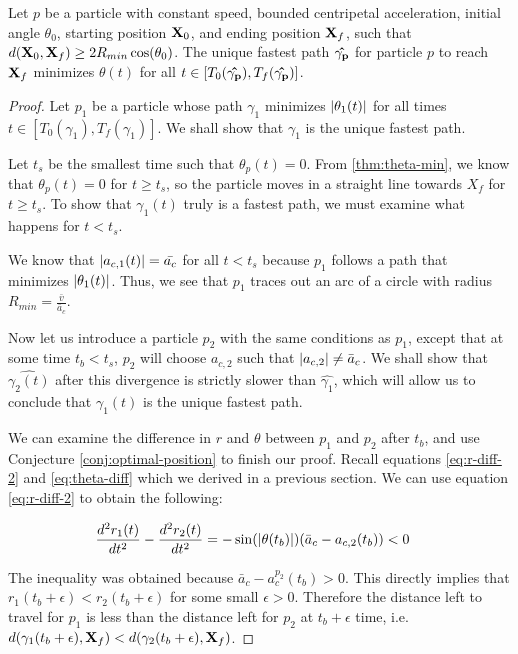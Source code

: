 \begin{theorem}
  Let  $p$ be a particle with constant speed, bounded centripetal acceleration, initial angle $\theta_0$, starting position $\mathbf{X}_0$, and ending position $\mathbf{X}_f$, such that $d(\bvec{X}_0, \bvec{X}_f) \ge 2 R_{min} \cos\paren{\theta_0}$. The unique fastest path $\mathbf{\hat{\gamma_p}}$ for particle $p$ to reach $\mathbf{X}_f$ minimizes $\theta(t)$ for all $t \in [T_0(\mathbf{\hat{\gamma_p}}), T_f(\mathbf{\hat{\gamma_p}})]$.
  \label{thm:restricted-theta}
\end{theorem}
\begin{proof}
Let $p_1$ be a particle whose path $\gamma_1$ minimizes $\abs{\theta_1(t)}$ for all times $t \in [T_0(\gamma_1), T_f(\gamma_1)]$. We shall show that $\gamma_1$ is the unique fastest path.

Let $t_s$ be the smallest time such that $\theta_p(t) = 0$. From \ref{thm:theta-min}, we know that $\theta_p(t) = 0$ for $t \ge t_s$, so the particle moves in a straight line towards $X_f$ for $t \ge t_s$. To show that $\gamma_1(t)$ truly is a fastest path, we must examine what happens for $t < t_s$.

We know that $\abs{a_{c,1}(t)} = \bar{a_c}$ for all $t < t_s$ because $p_1$ follows a path that minimizes $\abs{\theta_1(t)}$. Thus, we see that $p_1$ traces out an arc of a circle with radius $R_{min} = \frac{\bar{v}}{\bar{a}_c}$.

Now let us introduce a particle $p_2$ with the same conditions as $p_1$, except that at some time $t_b < t_s$, $p_2$ will choose $a_{c,2}$ such that $\abs{a_{c,2}} \neq \bar{a}_c$. We shall show that $\hat{\gamma_2(t)}$ after this divergence is strictly slower than $\hat{\gamma_1}$, which will allow us to conclude that $\gamma_1(t)$ is the unique fastest path.

We can examine the difference in $r$ and $\theta$ between $p_1$ and $p_2$ after $t_b$, and use Conjecture \ref{conj:optimal-position} to finish our proof. Recall equations \ref{eq:r-diff-2} and \ref{eq:theta-diff} which we derived in a previous section. We can use equation \ref{eq:r-diff-2} to obtain the following:

\begin{align*}
  \frac{d^2 r_1(t)}{d t^2} - \frac{d^2 r_2(t)}{d t^2} = - \sin\paren{\abs{\theta(t_b)}} \paren{\bar{a}_c - a_{c,2}(t_b)}
  & < 0
\end{align*}

The inequality was obtained because $\bar{a}_c - a^{p_2}_c(t_b) > 0$. This directly implies that $r_1(t_b + \epsilon) < r_2(t_b + \epsilon)$ for some small $\epsilon > 0$. Therefore the distance left to travel for $p_1$ is less than the distance left for $p_2$ at $t_b + \epsilon$ time, i.e. $d(\gamma_1(t_b + \epsilon), \mathbf{X}_f) < d(\gamma_2(t_b + \epsilon), \mathbf{X}_f)$.


\end{proof}
